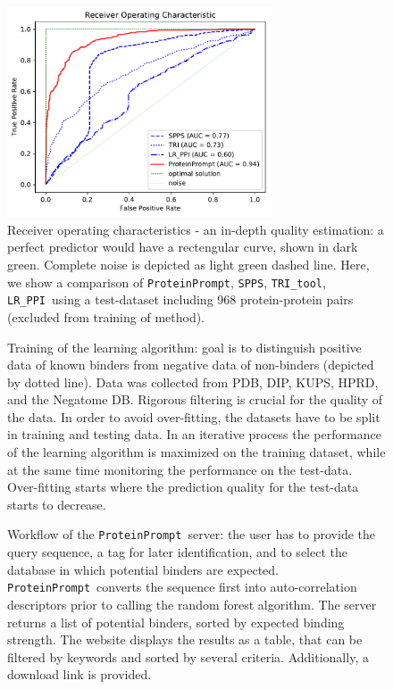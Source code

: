 \documentclass{article}
\newcommand{\spps}{\texttt{SPPS}}
\newcommand{\tri}{\texttt{TRI\_tool}}
\newcommand{\lr}{\texttt{LR\_PPI}}
\newcommand{\tool}{\texttt{ProteinPrompt}}
\begin{document}
\begin{figure}
  \centerline{\includegraphics[width=0.7\textwidth]{img/comparison_roc.pdf}}
  \caption{Receiver operating characteristics - an in-depth quality estimation: a perfect predictor would have a rectengular curve, shown in dark green. Complete noise is depicted as light green dashed line. Here, we show a comparison of \tool, \spps, \tri, \lr\ using a test-dataset including 968 protein-protein pairs (excluded from training of method). }
  \label{fig:comparison}
\end{figure}


\begin{figure}
  
  \caption{ Training of the learning algorithm: goal is to distinguish positive data of known binders from negative data of non-binders (depicted by dotted line). Data was collected from PDB, DIP, KUPS, HPRD, and the Negatome DB. Rigorous filtering is crucial for the quality of the data. In order to avoid over-fitting, the datasets have to be split in training and testing data. In an iterative process the performance of the learning algorithm is maximized on the training dataset, while at the same time monitoring the performance on the test-data. Over-fitting starts where the prediction quality for the test-data starts to decrease.}
  \label{fig:training}
\end{figure}


\begin{figure}
  
  \caption{ Workflow of the \tool\  server: the user has to provide the query sequence, a tag for later identification, and to select the database in which potential binders are expected. \tool\  converts the sequence first into auto-correlation descriptors prior to calling the random forest algorithm.
    The server returns a list of potential binders, sorted by expected binding strength.
     The website displays the results as a table, that can be filtered by keywords and sorted by several criteria. 
    Additionally, a download link is provided. }
  \label{fig:workflow}
\end{figure}
\end{document}
